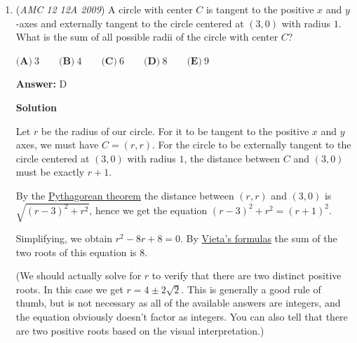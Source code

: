 \begin{enumerate}
 (For those curious, this comes from differentiating the equation for finite geometric sums)

 Using this equation, we have

 
 \[48+49i=i\frac{1-(n+1)i^n+ni^{n+1}}{(1-i)^2}\]
 \[=\frac{1-(n+1)i^n+ni^{n+1}}{-2}\]
 \[=-\frac{1}{2}+\frac{(n+1)i^n}{2}-\frac{ni^{n+1}}{2}\]

 Since the imaginary and the real part must be positive, we know that $i^{n+1}=-1$ or $i^{n+1}=-i$. By the same line of reason, $i^{n}=1,i$. This only works for $n\equiv 1 \mod 4$. Therefore, we have:

 
 \[\frac{-1+n}{2}+\frac{(n+1)i}{2}=48+49i\]

 Solving either the real or imaginary part gives $\boxed{\mathbf{(D) }97}$



	\item (\textit{AMC 12 12A 2009}) A circle with center $C$ is tangent to the positive $x$ and $y$-axes and externally tangent to the circle centered at $(3,0)$ with radius $1$. What is the sum of all possible radii of the circle with center $C$?


 $\textbf{(A)}\ 3 \qquad \textbf{(B)}\ 4 \qquad \textbf{(C)}\ 6 \qquad \textbf{(D)}\ 8 \qquad \textbf{(E)}\ 9$

 \textbf{Answer: }D



\textbf{Solution}

Let $r$ be the radius of our circle. For it to be tangent to the positive $x$ and $y$ axes, we must have $C=(r,r)$. For the circle to be externally tangent to the circle centered at $(3,0)$ with radius $1$, the distance between $C$ and $(3,0)$ must be exactly $r+1$.

 By the \href{https://artofproblemsolving.com/wiki/index.php?title=Pythagorean\_theorem}{Pythagorean theorem} the distance between $(r,r)$ and $(3,0)$ is $\sqrt{ (r-3)^2 + r^2 }$, hence we get the equation $(r-3)^2 + r^2 = (r+1)^2$.

 Simplifying, we obtain $r^2 - 8r + 8 = 0$. By \href{https://artofproblemsolving.com/wiki/index.php?title=Vieta\%27s\_formulas}{Vieta's formulas} the sum of the two roots of this equation is $\boxed{8}$.

 (We should actually solve for $r$ to verify that there are two distinct positive roots. In this case we get $r=4\pm 2\sqrt 2$. This is generally a good rule of thumb, but is not necessary as all of the available answers are integers, and the equation obviously doesn't factor as integers. You can also tell that there are two positive roots based on the visual interpretation.)


\end{enumerate}
